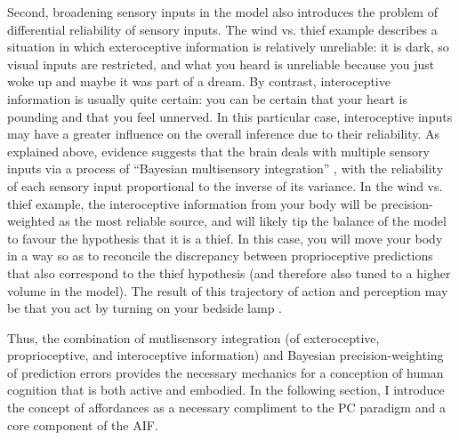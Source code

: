 \begin{CJK}{UTF8}{gbsn}
Second, broadening sensory inputs in the model also introduces the problem of differential reliability of sensory inputs.  The wind vs. thief example describes a situation in which exteroceptive information is relatively unreliable: it is dark, so visual inputs are restricted, and what you heard is unreliable because you just woke up and maybe it was part of a dream.  By contrast, interoceptive information is usually quite certain: you can be certain that your heart is pounding and that you feel unnerved.  In this particular case, interoceptive inputs may have a greater influence on the overall inference due to their reliability.  As explained above, evidence suggests that the brain deals with multiple sensory inputs via a process of ``Bayesian multisensory integration'' \citep{Ernst2004}, with the reliability of each sensory input proportional to the inverse of its variance.  In the wind vs. thief example, the interoceptive information from your body will be precision-weighted as the most reliable source, and will likely tip the balance of the model to favour the hypothesis that it is a thief.  In this case, you will move your body in a way so as to reconcile the discrepancy between proprioceptive predictions that also correspond to the thief hypothesis (and therefore also tuned to a higher volume in the model).  The result of this trajectory of action and perception may be that you act by turning on your bedside lamp \citep{Pezzulo2014}.

Thus, the combination of mutlisensory integration (of exteroceptive, proprioceptive, and interoceptive information) and Bayesian precision-weighting of prediction errors provides the necessary mechanics for a conception of human cognition that is both active and embodied.    In the following section, I introduce the concept of affordances as a necessary compliment to the PC paradigm and a core component of the AIF.






\end{CJK}
